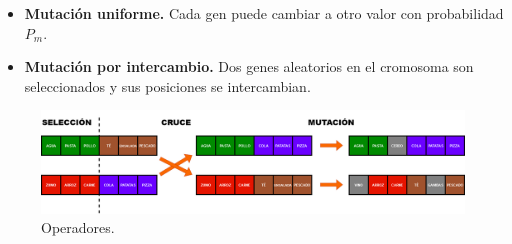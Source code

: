 \begin{itemize}
  \item \textbf{Mutación uniforme.} Cada gen puede cambiar a otro valor con probabilidad \(P_m\).
  \item \textbf{Mutación por intercambio.} Dos genes aleatorios en el cromosoma son seleccionados y sus posiciones se intercambian. 
\end{itemize}

\begin{figure}[H]
  \centering
  \includegraphics[width=1\textwidth]{figures/operadores.png}
  \caption{Operadores.}
  \label{fig:operadores}
\end{figure}